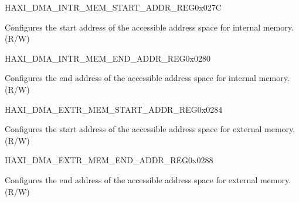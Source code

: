 \begin{register}{H}{AXI\_DMA\_INTR\_MEM\_START\_ADDR\_REG}{0x027C}\label{regdesc:AXIDMAINTRMEMSTARTADDRREG}
%
\regnewline%
\begin{regdesc}\begin{reglist}
\label{fielddesc:AXIDMAACCESSINTRMEMSTARTADDR}\item [AXI\_DMA\_ACCESS\_INTR\_MEM\_START\_ADDR] Configures the start address of the accessible address space for internal memory. (R/W)
\end{reglist}\end{regdesc}
\end{register}


\begin{register}{H}{AXI\_DMA\_INTR\_MEM\_END\_ADDR\_REG}{0x0280}\label{regdesc:AXIDMAINTRMEMENDADDRREG}
%
\regnewline%
\begin{regdesc}\begin{reglist}
\label{fielddesc:AXIDMAACCESSINTRMEMENDADDR}\item [AXI\_DMA\_ACCESS\_INTR\_MEM\_END\_ADDR] Configures the end address of the accessible address space for internal memory. (R/W)
\end{reglist}\end{regdesc}
\end{register}


\begin{register}{H}{AXI\_DMA\_EXTR\_MEM\_START\_ADDR\_REG}{0x0284}\label{regdesc:AXIDMAEXTRMEMSTARTADDRREG}
%
\regnewline%
\begin{regdesc}\begin{reglist}
\label{fielddesc:AXIDMAACCESSEXTRMEMSTARTADDR}\item [AXI\_DMA\_ACCESS\_EXTR\_MEM\_START\_ADDR] Configures the start address of the accessible address space for external memory. (R/W)
\end{reglist}\end{regdesc}
\end{register}


\begin{register}{H}{AXI\_DMA\_EXTR\_MEM\_END\_ADDR\_REG}{0x0288}\label{regdesc:AXIDMAEXTRMEMENDADDRREG}
%
\regnewline%
\begin{regdesc}\begin{reglist}
\label{fielddesc:AXIDMAACCESSEXTRMEMENDADDR}\item [AXI\_DMA\_ACCESS\_EXTR\_MEM\_END\_ADDR] Configures the end address of the accessible address space for external memory. (R/W)
\end{reglist}\end{regdesc}
\end{register}



